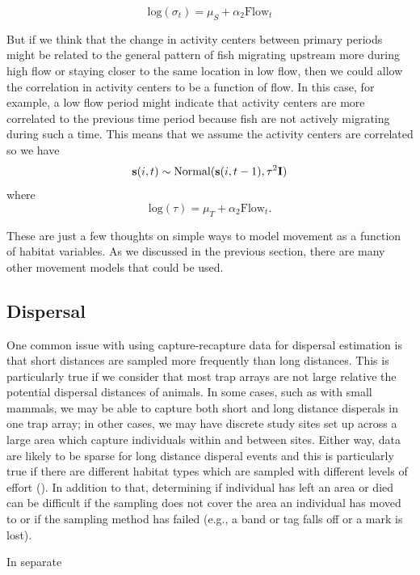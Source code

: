 \[
 \mbox{log}(\sigma_t) = \mu_S + \alpha_2 \mbox{Flow}_t
\]

But if we think that the change in activity centers between primary periods might be related to the 
general pattern of fish migrating upstream more during high flow or staying closer to the same location
in low flow, then we could allow the correlation in activity centers to be a function of flow.  In this
case, for example, a low flow period might indicate that activity centers are more correlated to the previous
time period because fish are not actively migrating during such a time.  
This means that we assume the
activity centers are correlated so we have
\[
{\bf s}(i,t) \sim \mbox{Normal}({\bf
  s}(i,t-1), \tau^{2} {\bf I})
\]
where
\[
\mbox{log}(\tau) = \mu_T + \alpha_2 \mbox{Flow}_t.
\]

These are just a few thoughts on simple ways to model movement as a
function of habitat variables. 
As we discussed in the previous section, there
are many other movement models that could be used.


\subsection{Dispersal}

One common issue with using capture-recapture data for dispersal estimation is that short distances
are sampled more frequently than long distances.  This is particularly true if we consider that most
trap arrays are not large relative the potential dispersal distances of animals.   In some cases,
such as with small mammals, we may be able to capture both short and long distance disperals 
in one trap array; in other cases, we may have discrete study sites set up across a large area which
capture individuals within and between sites.  Either way, data are likely to be sparse for long distance
disperal events and this is particularly true if there are different habitat types which are sampled
with different levels of effort (\cite{ovaskainen_etal:2008}).  In addition to that, determining if individual 
has left an area or died can be difficult if the sampling does not cover the area an individual has 
moved to or if the sampling method has failed (e.g., a band or tag falls off or a mark is lost).  

In separate


